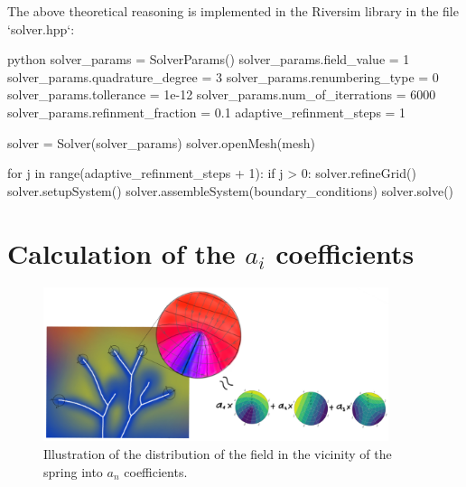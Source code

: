 \documentclass[]{pracamgr}
\begin{document}
        The above theoretical reasoning is implemented in the Riversim library in the file `solver.hpp`:
        
        \begin{mintedbox}{python}
          solver_params = SolverParams()
          solver_params.field_value = 1
          solver_params.quadrature_degree = 3
          solver_params.renumbering_type = 0
          solver_params.tollerance = 1e-12
          solver_params.num_of_iterrations =  6000
          solver_params.refinment_fraction = 0.1
          adaptive_refinment_steps = 1
        
          solver = Solver(solver_params)
          solver.openMesh(mesh)
          
          for j in range(adaptive_refinment_steps + 1):
              if j > 0:
                  solver.refineGrid()
              solver.setupSystem()
              solver.assembleSystem(boundary_conditions)
              solver.solve()\end{mintedbox}

    \section{Calculation of the $a_i$ coefficients}
      
      \begin{figure}[H]
        \centering
        \includegraphics[width=0.9\textwidth]{figs/series_params_integration.jpg}        
        \caption{Illustration of the distribution of the field in the vicinity of the spring into $a_n$ coefficients.}
        \label{series_params_integration}
      \end{figure}
\end{document}
